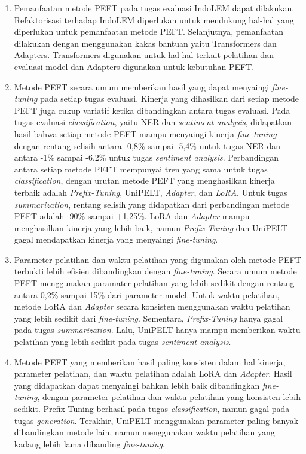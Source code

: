 \begin{enumerate}
    \item{
        Pemanfaatan metode PEFT pada tugas evaluasi IndoLEM dapat dilakukan. Refaktorisasi terhadap IndoLEM diperlukan untuk mendukung hal-hal yang diperlukan untuk pemanfaatan metode PEFT. Selanjutnya, pemanfaatan dilakukan dengan menggunakan kakas bantuan yaitu Transformers dan Adapters. Transformers digunakan untuk hal-hal terkait pelatihan dan evaluasi model dan Adapters digunakan untuk kebutuhan PEFT.
    }
    \item {
            Metode PEFT secara umum memberikan hasil yang dapat menyaingi \textit{fine-tuning} pada setiap tugas evaluasi. Kinerja yang dihasilkan dari setiap metode PEFT juga cukup variatif ketika dibandingkan antara tugas evaluasi. Pada tugas evaluasi \textit{classification}, yaitu NER dan \textit{sentiment analysis}, didapatkan hasil bahwa setiap metode PEFT mampu menyaingi kinerja \textit{fine-tuning} dengan rentang selisih antara -0,8\% sampai -5,4\% untuk tugas NER dan antara -1\% sampai -6,2\% untuk tugas \textit{sentiment analysis}. Perbandingan antara setiap metode PEFT mempunyai tren yang sama untuk tugas \textit{classification}, dengan urutan metode PEFT yang menghasilkan kinerja terbaik adalah \textit{Prefix-Tuning}, UniPELT, \textit{Adapter}, dan \textit{LoRA}. Untuk tugas \textit{summarization}, rentang selisih yang didapatkan dari perbandingan metode PEFT adalah -90\% sampai +1,25\%. LoRA dan \textit{Adapter} mampu menghasilkan kinerja yang lebih baik, namun \textit{Prefix-Tuning} dan UniPELT gagal mendapatkan kinerja yang menyaingi \textit{fine-tuning}.
    }
    \item {
            Parameter pelatihan dan waktu pelatihan yang digunakan oleh metode PEFT terbukti lebih efisien dibandingkan dengan \textit{fine-tuning}. Secara umum metode PEFT menggunakan paramater pelatihan yang lebih sedikit dengan rentang antara 0,2\% sampai 15\% dari parameter model. Untuk waktu pelatihan, metode LoRA dan \textit{Adapter} secara konsisten menggunakan waktu pelatihan yang lebih sedikit dari \textit{fine-tuning}. Sementara, \textit{Prefix-Tuning} hanya gagal pada tugas \textit{summarization}. Lalu, UniPELT hanya mampu memberikan waktu pelatihan yang lebih sedikit pada tugas \textit{sentiment analysis}.
    }
    \item {
            Metode PEFT yang memberikan hasil paling konsisten dalam hal kinerja, parameter pelatihan, dan waktu pelatihan adalah LoRA dan \textit{Adapter}. Hasil yang didapatkan dapat menyaingi bahkan lebih baik dibandingkan \textit{fine-tuning}, dengan parameter pelatihan dan waktu pelatihan yang konsisten lebih sedikit. Prefix-Tuning berhasil pada tugas \textit{classification}, namun gagal pada tugas \textit{generation}. Terakhir, UniPELT menggunakan parameter paling banyak dibandingkan metode lain, namun menggunakan waktu pelatihan yang kadang lebih lama dibanding \textit{fine-tuning}.
    }
\end{enumerate}


